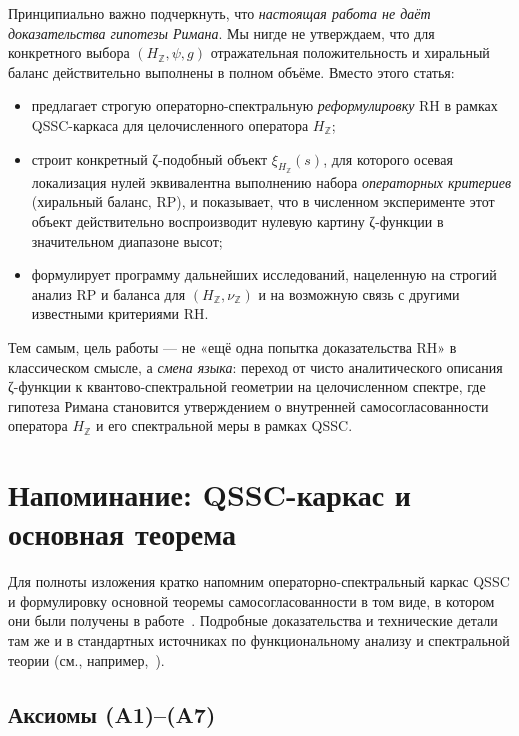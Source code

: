 \documentclass{article}
\numberwithin{equation}{section}
\theoremstyle{plain}
\theoremstyle{definition}
\theoremstyle{remark}
\begin{document}
\noindent
Принципиально важно подчеркнуть, что \emph{настоящая работа не даёт
доказательства гипотезы Римана}. Мы нигде не утверждаем, что для конкретного
выбора $(H_{\mathbb Z},\psi,g)$ отражательная положительность и хиральный
баланс действительно выполнены в полном объёме. Вместо этого статья:

\begin{itemize}[leftmargin=2.2em]
  \item предлагает строгую операторно-спектральную \emph{реформулировку} RH
  в рамках QSSC-каркаса для целочисленного оператора $H_{\mathbb Z}$;

  \item строит конкретный ζ-подобный объект $\xi_{H_{\mathbb Z}}(s)$, для
  которого осевая локализация нулей эквивалентна выполнению набора
  \emph{операторных критериев} (хиральный баланс, RP), и показывает, что в
  численном эксперименте этот объект действительно воспроизводит нулевую
  картину ζ-функции в значительном диапазоне высот;

  \item формулирует программу дальнейших исследований, нацеленную на строгий
  анализ RP и баланса для $(H_{\mathbb Z},\nu_{\mathbb Z})$ и на возможную
  связь с другими известными критериями RH.
\end{itemize}

\noindent
Тем самым, цель работы --- не «ещё одна попытка доказательства RH» в
классическом смысле, а \emph{смена языка}: переход от чисто аналитического
описания ζ-функции к квантово-спектральной геометрии на целочисленном спектре,
где гипотеза Римана становится утверждением о внутренней самосогласованности
оператора $H_{\mathbb Z}$ и его спектральной меры в рамках QSSC.
\clearpage


\section{Напоминание: QSSC-каркас и основная теорема}
\label{sec:qssc-recap}
\label{sec:qssc-core}

\noindent
Для полноты изложения кратко напомним операторно-спектральный каркас
QSSC и формулировку основной теоремы самосогласованности в том виде,
в котором они были получены в работе~\cite{Monakhov-QSG-002}. Подробные
доказательства и технические детали там же и в стандартных источниках по
функциональному анализу и спектральной теории
(см., например,~\cite{ReedSimon1,ReedSimonII,OsterwalderSchrader1973}).

\subsection{Аксиомы (A1)–(A7)}
\label{subsec:qssc-axioms}
\label{sec:axioms}
\end{document}
